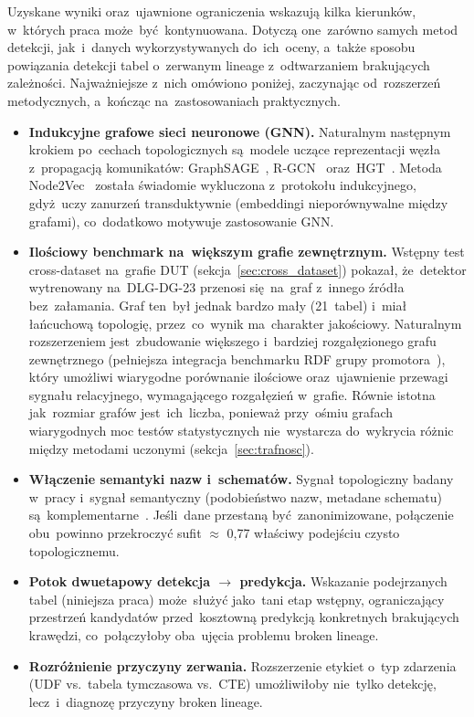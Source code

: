 \documentclass[polish,master,a4paper,oneside]{ppfcmthesis}
\renewcommand{\_}{\origtextunderscore\ifmmode\else\allowbreak\fi}
\begin{document}
Uzyskane wyniki oraz~ujawnione ograniczenia wskazują kilka kierunków, w~których
praca może~być~kontynuowana. Dotyczą one~zarówno samych metod detekcji, jak~i~danych
wykorzystywanych do~ich~oceny, a~także sposobu powiązania detekcji tabel
o~zerwanym lineage z~odtwarzaniem brakujących zależności. Najważniejsze z~nich
omówiono poniżej, zaczynając od~rozszerzeń metodycznych, a~kończąc
na~zastosowaniach praktycznych.

\begin{itemize}
  \item \textbf{Indukcyjne grafowe sieci neuronowe (GNN).} Naturalnym
        następnym krokiem po~cechach topologicznych są~modele uczące
        reprezentacji węzła z~propagacją komunikatów:
        GraphSAGE~\cite{Hamilton2017}, R-GCN~\cite{Schlichtkrull2018}
        oraz~HGT~\cite{Hu2020}.
        Metoda Node2Vec~\cite{Grover2016} została świadomie wykluczona
        z~protokołu indukcyjnego,
        gdyż~uczy zanurzeń transduktywnie (embeddingi nieporównywalne
        między grafami), co~dodatkowo motywuje zastosowanie GNN.
  \item \textbf{Ilościowy benchmark na~większym grafie zewnętrznym.}
        Wstępny test cross-dataset na~grafie DUT (sekcja~\ref{sec:cross_dataset})
        pokazał, że~detektor wytrenowany na~DLG-DG-23 przenosi się~na~graf
        z~innego źródła bez~załamania. Graf ten~był jednak bardzo mały
        (21~tabel) i~miał łańcuchową topologię, przez~co~wynik ma~charakter
        jakościowy. Naturalnym rozszerzeniem jest~zbudowanie większego
        i~bardziej rozgałęzionego grafu zewnętrznego (pełniejsza integracja
        benchmarku RDF grupy promotora~\cite{Dutkiewicz2026}), który umożliwi
        wiarygodne porównanie ilościowe oraz~ujawnienie przewagi sygnału
        relacyjnego, wymagającego rozgałęzień w~grafie. Równie istotna
        jak~rozmiar grafów jest~ich~liczba, ponieważ przy~ośmiu grafach
        wiarygodnych moc testów statystycznych nie~wystarcza do~wykrycia
        różnic między metodami uczonymi (sekcja~\ref{sec:trafnosc}).
  \item \textbf{Włączenie semantyki nazw i~schematów.} Sygnał topologiczny
        badany w~pracy i~sygnał semantyczny (podobieństwo nazw, metadane
        schematu) są~komplementarne~\cite{Boinski2025,Brzeski2025}. Jeśli~dane
        przestaną być~zanonimizowane, połączenie obu~powinno przekroczyć
        sufit $\approx$ 0{,}77 właściwy podejściu czysto topologicznemu.
  \item \textbf{Potok dwuetapowy detekcja $\to$ predykcja.} Wskazanie
        podejrzanych tabel (niniejsza praca) może~służyć jako~tani etap
        wstępny, ograniczający przestrzeń kandydatów przed~kosztowną predykcją
        konkretnych brakujących krawędzi, co~połączyłoby oba~ujęcia problemu
        broken lineage.
  \item \textbf{Rozróżnienie przyczyny zerwania.} Rozszerzenie etykiet o~typ
        zdarzenia (UDF vs.~tabela tymczasowa vs.~CTE) umożliwiłoby nie~tylko
        detekcję, lecz~i~diagnozę przyczyny broken lineage.
\end{itemize}
\end{document}
